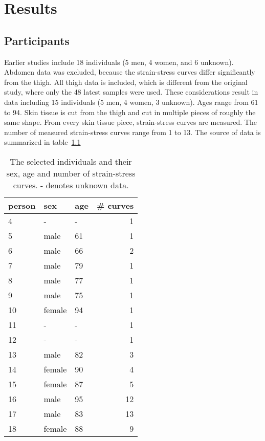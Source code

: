 \chapter{Results}

\section{Participants}

Earlier studies include 18 individuals (5 men, 4 women, and 6 unknown).
Abdomen data was excluded, because the strain-stress curves differ significantly from the thigh.
All thigh data is included, which is different from the original study, where only the 48 latest samples were used.
These considerations result in data including 15 individuals (5 men, 4 women, 3 unknown).
Ages range from 61 to 94.
Skin tissue is cut from the thigh and cut in multiple pieces of roughly the same shape.
From every skin tissue piece, strain-stress curves are measured.
The number of measured strain-stress curves range from 1 to 13.
The source of data is summarized in table~\ref{tab:source_of_data}
\begin{table}
    \centering
    \caption[Source of data]{
        The selected individuals and their sex, age and number of strain-stress curves.
        - denotes unknown data.
    }
    \label{tab:source_of_data}
    \begin{tabular}{lllr}
        \toprule
        person & sex    & age & \# curves \\
        \midrule
        4      & -      & -   & 1         \\
        5      & male   & 61  & 1         \\
        6      & male   & 66  & 2         \\
        7      & male   & 79  & 1         \\
        8      & male   & 77  & 1         \\
        9      & male   & 75  & 1         \\
        10     & female & 94  & 1         \\
        11     & -      & -   & 1         \\
        12     & -      & -   & 1         \\
        13     & male   & 82  & 3         \\
        14     & female & 90  & 4         \\
        15     & female & 87  & 5         \\
        16     & male   & 95  & 12        \\
        17     & male   & 83  & 13        \\
        18     & female & 88  & 9         \\
        \bottomrule
    \end{tabular}
\end{table}